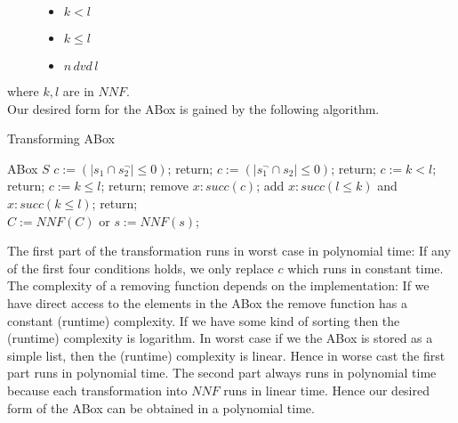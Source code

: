 \documentclass[a4paper,11pt]{scrartcl}
\theoremstyle{break}
\theoremstyle{definition}
\begin{document}
\begin{figure}[H]
\begin{minipage}[t]{.3\textwidth}
\raggedright
\begin{itemize}
\item $k<l$
\end{itemize}
\end{minipage}%
\begin{minipage}[t]{.3\textwidth}
\raggedleft
\begin{itemize}
\item $k\leq l$
\end{itemize}
\end{minipage}%
\begin{minipage}[t]{.3\textwidth}
\raggedleft
\begin{itemize}
\item $n\,dvd\, l$
\end{itemize}
\end{minipage}
\end{figure}
where $k,l$ are in $NNF$.\\
Our desired form for the ABox is gained by the following algorithm.
\begin{algorithm}[H] \caption{Transforming ABox}
\begin{algorithmic}[l]
\State ABox $S$
\State $c:=(|s_1\cap s_2^\neg|\leq 0)$; return;
\EndIf
{}
\State $c:=(|s_1^\neg\cap s_2|\leq 0)$; return;
\EndIf
{}
\State $c:=k< l$; return;
\EndIf
{}
\State $c:=k\leq l$; return;
\EndIf
{}
\State remove $x:succ(c)$;
\State add $x:succ(l\leq k)$ and $x:succ(k\leq l)$; return;
\EndIf
\EndFor\\
\State $C:=NNF(C)$ or $s:=NNF(s)$;
\EndFor
\end{algorithmic}
\end{algorithm}
The first part of the transformation runs in worst case in polynomial time: If any of the first four conditions holds, we only replace $c$ which runs in constant time.  The complexity of a removing function depends on the implementation: If we have direct access to the elements in the ABox the remove function has a constant (runtime) complexity. If we have some kind of sorting then the (runtime) complexity is logarithm. In worst case if we the ABox is stored as a simple list, then the (runtime) complexity is linear. Hence in worse cast the first part runs in polynomial time. The second part always runs in polynomial time because each transformation into $NNF$ runs in linear time. Hence our desired form of the ABox can be obtained in a polynomial time.
\end{document}
